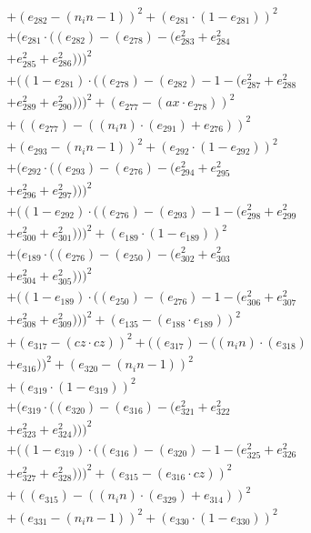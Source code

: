 \documentclass[10pt, a4paper]{article}
\begin{document}
\begin{align*}
& + (e_{282} - (n_in - 1))^{2} + (e_{281}  \cdot  (1 - e_{281}))^{2} \\
& + (e_{281}  \cdot  ((e_{282}) - (e_{278}) - (e_{283}^{2} + e_{284}^{2} \\
& + e_{285}^{2} + e_{286}^{2})))^{2} \\
& + ((1 - e_{281})  \cdot  ((e_{278}) - (e_{282}) - 1 - (e_{287}^{2} + e_{288}^{2} \\
& + e_{289}^{2} + e_{290}^{2})))^{2} + (e_{277} - (ax  \cdot  e_{278}))^{2} \\
& + ((e_{277}) - ((n_in)  \cdot  (e_{291}) + e_{276}))^{2} \\
& + (e_{293} - (n_in - 1))^{2} + (e_{292}  \cdot  (1 - e_{292}))^{2} \\
& + (e_{292}  \cdot  ((e_{293}) - (e_{276}) - (e_{294}^{2} + e_{295}^{2} \\
& + e_{296}^{2} + e_{297}^{2})))^{2} \\
& + ((1 - e_{292})  \cdot  ((e_{276}) - (e_{293}) - 1 - (e_{298}^{2} + e_{299}^{2} \\
& + e_{300}^{2} + e_{301}^{2})))^{2} + (e_{189}  \cdot  (1 - e_{189}))^{2} \\
& + (e_{189}  \cdot  ((e_{276}) - (e_{250}) - (e_{302}^{2} + e_{303}^{2} \\
& + e_{304}^{2} + e_{305}^{2})))^{2} \\
& + ((1 - e_{189})  \cdot  ((e_{250}) - (e_{276}) - 1 - (e_{306}^{2} + e_{307}^{2} \\
& + e_{308}^{2} + e_{309}^{2})))^{2} + (e_{135} - (e_{188}  \cdot  e_{189}))^{2} \\
& + (e_{317} - (cz  \cdot  cz))^{2} + ((e_{317}) - ((n_in)  \cdot  (e_{318}) \\
& + e_{316}))^{2} + (e_{320} - (n_in - 1))^{2} \\
& + (e_{319}  \cdot  (1 - e_{319}))^{2} \\
& + (e_{319}  \cdot  ((e_{320}) - (e_{316}) - (e_{321}^{2} + e_{322}^{2} \\
& + e_{323}^{2} + e_{324}^{2})))^{2} \\
& + ((1 - e_{319})  \cdot  ((e_{316}) - (e_{320}) - 1 - (e_{325}^{2} + e_{326}^{2} \\
& + e_{327}^{2} + e_{328}^{2})))^{2} + (e_{315} - (e_{316}  \cdot  cz))^{2} \\
& + ((e_{315}) - ((n_in)  \cdot  (e_{329}) + e_{314}))^{2} \\
& + (e_{331} - (n_in - 1))^{2} + (e_{330}  \cdot  (1 - e_{330}))^{2} \\

\end{align*}
\end{document}
